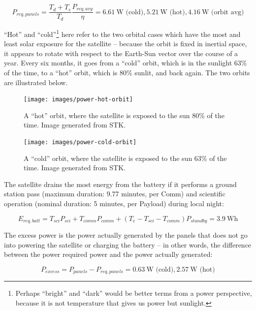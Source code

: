 \documentclass[12pt]{article}
\begin{document}
\begin{equation}
P_{req,panels} = \frac{T_d + T_e}{T_d}\frac{P_{req,avg}}{\eta} = 6.61 \ \text{W (cold)}, 5.21 \ \text{W (hot)}, 4.16 \ \text{W (orbit avg)}
\label{eq:power-required-panels}
\end{equation}

``Hot'' and ``cold''\footnote{Perhaps ``bright'' and ``dark'' would be better terms from a power perspective, because it is not temperature that gives us power but sunlight.} here refer to the two orbital cases which have the most and least solar exposure for the satellite – because the orbit is fixed in inertial space, it appears to rotate with respect to the Earth-Sun vector over the course of a year.  Every six months, it goes from a “cold” orbit, which is in the sunlight 63\% of the time, to a “hot” orbit, which is 80\% sunlit, and back again.  The two orbits are illustrated below.

\begin{figure}[ht]%
\centering
\texttt{[image: images/power-hot-orbit]}%
\caption{A ``hot'' orbit, where the satellite is exposed to the sun 80\% of the time.  Image generated from STK.}%
\label{fig:power-hot-orbit}%
\end{figure}

\begin{figure}[ht]%
\centering
\texttt{[image: images/power-cold-orbit]}%
\caption{A ``cold'' orbit, where the satellite is exposed to the sun 63\% of the time.  Image generated from STK.}%
\label{fig:power-cold-orbit}%
\end{figure}

The satellite drains the most energy from the battery if it performs a ground station pass (maximum duration: 9.77 minutes, per Comm) and scientific operation (nominal duration: 5 minutes, per Payload) during local night:

\begin{equation}
E_{req,batt} = T_{sci} P_{sci} + T_{comm} P_{comm} + (T_e - T_{sci} - T_{comm}) P_{standby} = 3.9 \ \text{Wh}
\label{eq:power-batt-req}
\end{equation}

The excess power is the power actually generated by the panels that does not go into powering the satellite or charging the battery -- in other words, the difference between the power required power and the power actually generated:

\begin{equation}
P_{excess} = P_{panels} - P_{req,panels} = 0.63 \ \text{W (cold)}, 2.57 \ \text{W (hot)}
\label{eq:power-excess}
\end{equation}
\end{document}

